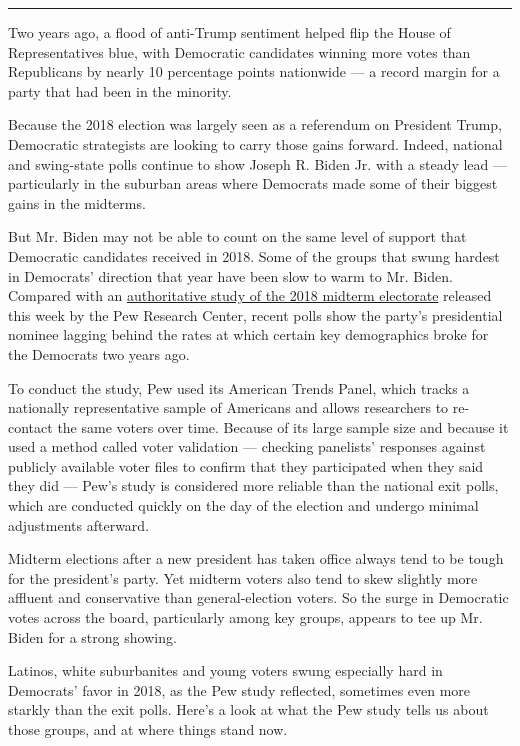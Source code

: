 \begin{center}\rule{0.5\linewidth}{\linethickness}\end{center}

Two years ago, a flood of anti-Trump sentiment helped flip the House of
Representatives blue, with Democratic candidates winning more votes than
Republicans by nearly 10 percentage points nationwide --- a record
margin for a party that had been in the minority.

Because the 2018 election was largely seen as a referendum on President
Trump, Democratic strategists are looking to carry those gains forward.
Indeed, national and swing-state polls continue to show Joseph R. Biden
Jr. with a steady lead --- particularly in the suburban areas where
Democrats made some of their biggest gains in the midterms.

But Mr. Biden may not be able to count on the same level of support that
Democratic candidates received in 2018. Some of the groups that swung
hardest in Democrats' direction that year have been slow to warm to Mr.
Biden. Compared with an
\href{https://www.pewresearch.org/methods/2020/09/08/democrats-made-gains-from-multiple-sources-in-2018-midterm-victories/}{authoritative
study of the 2018 midterm electorate} released this week by the Pew
Research Center, recent polls show the party's presidential nominee
lagging behind the rates at which certain key demographics broke for the
Democrats two years ago.

To conduct the study, Pew used its American Trends Panel, which tracks a
nationally representative sample of Americans and allows researchers to
re-contact the same voters over time. Because of its large sample size
and because it used a method called voter validation --- checking
panelists' responses against publicly available voter files to confirm
that they participated when they said they did --- Pew's study is
considered more reliable than the national exit polls, which are
conducted quickly on the day of the election and undergo minimal
adjustments afterward.

Midterm elections after a new president has taken office always tend to
be tough for the president's party. Yet midterm voters also tend to skew
slightly more affluent and conservative than general-election voters. So
the surge in Democratic votes across the board, particularly among key
groups, appears to tee up Mr. Biden for a strong showing.

Latinos, white suburbanites and young voters swung especially hard in
Democrats' favor in 2018, as the Pew study reflected, sometimes even
more starkly than the exit polls. Here's a look at what the Pew study
tells us about those groups, and at where things stand now.

